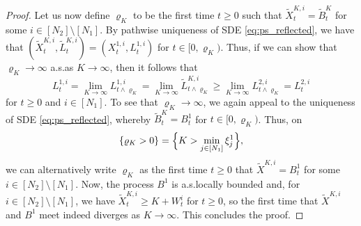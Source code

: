 \documentclass[10pt,a4paper]{amsart}
\begin{document}
\begin{proof}
Let us now define $\varrho_K$ to be the first time $t \geq 0$ such that $\tilde{X}^{K, i}_t = \tilde{B}^K_t$ for some $i \in [N_2] \setminus [N_1]$. By pathwise uniqueness of SDE \eqref{eq:ps_reflected}, we have that $(\tilde{X}^{K, i}_t, \tilde{L}^{K, i}_t) = (X^{1, i}_t, L^{1, i}_t)$ for $t \in [0, \varrho_K)$. Thus, if we can show that $\varrho_K \to \infty$ a.s.\@ as $K \to \infty$, then it follows that
\begin{equation*}
    L^{1, i}_t = \lim_{K \to \infty} L^{1, i}_{t \land \varrho_K} = \lim_{K \to \infty} \tilde{L}^{K, i}_{t \land \varrho_K} \geq \lim_{K \to \infty} L^{2, i}_{t \land \varrho_K} = L^{2, i}_t
\end{equation*}
for $t \geq 0$ and $i \in [N_1]$. To see that $\varrho_K \to \infty$, we again appeal to the uniqueness of SDE \eqref{eq:ps_reflected}, whereby $\tilde{B}^K_t = B^1_t$ for $t \in [0, \varrho_K)$. Thus, on
\begin{equation*}
    \{\varrho_K > 0\} = \Bigl\{K > \min_{j \in [N_1]} \xi^1_j\Bigr\},
\end{equation*}
we can alternatively write $\varrho_K$ as the first time $t \geq 0$ that $\tilde{X}^{K, i} = B^1_t$ for some $i \in [N_2] \setminus [N_1]$. Now, the process $B^1$ is a.s.\@ locally bounded and, for $i \in [N_2] \setminus [N_1]$, we have $\tilde{X}^{K, i}_t \geq K + W^i_t$ for $t \geq 0$, so the first time that $\tilde{X}^{K, i}$ and $B^1$ meet indeed diverges as $K \to \infty$. This concludes the proof.
\end{proof}
\end{document}
